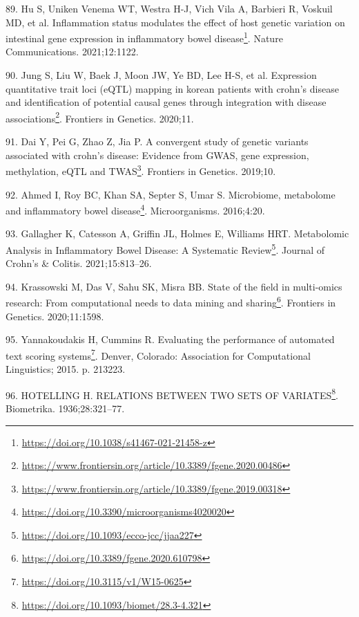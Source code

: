 \documentclass[
  a4paper,
]{book}
\DeclareRobustCommand{\href}[2]{#2\footnote{\url{#1}}}
\newlength{\cslhangindent}
\newlength{\cslentryspacingunit} %
\newenvironment{CSLReferences}[2] %
 {%
  \setlength{\parindent}{0pt}
  \ifodd #1
  \let\oldpar\par
  \def\par{\hangindent=\cslhangindent\oldpar}
  \fi
  \setlength{\parskip}{#2\cslentryspacingunit}
 }%
 {}
\begin{document}
\begin{CSLReferences}{0}{0}
\leavevmode{}%
89. Hu S, Uniken Venema WT, Westra H-J, Vich Vila A, Barbieri R, Voskuil MD, et al. \href{https://doi.org/10.1038/s41467-021-21458-z}{Inflammation status modulates the effect of host genetic variation on intestinal gene expression in inflammatory bowel disease}. Nature Communications. 2021;12:1122.

\leavevmode{}%
90. Jung S, Liu W, Baek J, Moon JW, Ye BD, Lee H-S, et al. \href{https://www.frontiersin.org/article/10.3389/fgene.2020.00486}{Expression quantitative trait loci (eQTL) mapping in korean patients with crohn{'}s disease and identification of potential causal genes through integration with disease associations}. Frontiers in Genetics. 2020;11.

\leavevmode{}%
91. Dai Y, Pei G, Zhao Z, Jia P. \href{https://www.frontiersin.org/article/10.3389/fgene.2019.00318}{A convergent study of genetic variants associated with crohn{'}s disease: Evidence from GWAS, gene expression, methylation, eQTL and TWAS}. Frontiers in Genetics. 2019;10.

\leavevmode{}%
92. Ahmed I, Roy BC, Khan SA, Septer S, Umar S. \href{https://doi.org/10.3390/microorganisms4020020}{Microbiome, metabolome and inflammatory bowel disease}. Microorganisms. 2016;4:20.

\leavevmode{}%
93. Gallagher K, Catesson A, Griffin JL, Holmes E, Williams HRT. \href{https://doi.org/10.1093/ecco-jcc/jjaa227}{Metabolomic Analysis in Inflammatory Bowel Disease: A Systematic Review}. Journal of Crohn's \& Colitis. 2021;15:813--26.

\leavevmode{}%
94. Krassowski M, Das V, Sahu SK, Misra BB. \href{https://doi.org/10.3389/fgene.2020.610798}{State of the field in multi-omics research: From computational needs to data mining and sharing}. Frontiers in Genetics. 2020;11:1598.

\leavevmode{}%
95. Yannakoudakis H, Cummins R. \href{https://doi.org/10.3115/v1/W15-0625}{Evaluating the performance of automated text scoring systems}. Denver, Colorado: Association for Computational Linguistics; 2015. p. 213223.

\leavevmode{}%
96. HOTELLING H. \href{https://doi.org/10.1093/biomet/28.3-4.321}{{RELATIONS BETWEEN TWO SETS OF VARIATES}}. Biometrika. 1936;28:321--77.


\end{CSLReferences}
\end{document}

